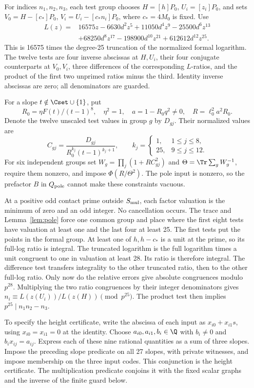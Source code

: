 For indices $n_1,n_2,n_3$, each test group chooses $H=[h]P_0$,
$U_i=[z_i]P_0$, and sets $V_0=H-[c_*]P_0$,
$V_i=U_i-[c_*n_i]P_0$, where $c_*=4M_0$ is fixed. Use
\begin{align*}
 L(z)={}&16575z-6630d^2z^5+11050d^4z^9-25500d^6z^{13}\\
        &+68250d^8z^{17}-198900d^{10}z^{21}+612612d^{12}z^{25}.
\end{align*}
This is 16575 times the degree-25 truncation of the normalized formal
logarithm. The twelve tests are four inverse abscissas at $H,U_i$,
their four conjugate counterparts at $V_0,V_i$, three differences of
the corresponding $L$-ratios, and the product of the first two unprimed
ratios minus the third. Identity inverse abscissas are zero; all
denominators are guarded.

For a slope $t\notin\Cset\cup\{1\}$, put
\[
 R_0=\eta F(t)/(t-1)^8,\quad\eta^2=1,\quad
 a=1-R_0q^2\ne0,\quad R=\ell_0^2a^2R_0.
\]
Denote the twelve unscaled test values in group $g$ by $D_{gj}$.
Their normalized values are
\[
 C_{gj}=\frac{D_{gj}}{R_0^{k_j}(t-1)^{k_j+1}},\qquad
 k_j=\begin{cases}1,&1\le j\le8,\\25,&9\le j\le12.\end{cases}
\]
For six independent groups set
$W_g=\prod_j(1+RC_{gj}^2)$ and
$\Theta=\Tr\sum_gW_g^{-1}$, require them nonzero, and impose
$\Phi(R/\Theta^2)$. The pole input is nonzero, so the prefactor $B$
in $Q_{\rm pole}$ cannot make these constraints vacuous.

At a positive odd contact prime outside $S_{\rm mul}$, each factor
valuation is the minimum of zero and an odd integer. No cancellation
occurs. The trace and Lemma~\ref{lem:pole} force one common group and
place where the first eight tests have valuation at least one and
the last four at least 25. The first tests put the points in the
formal group. At least one of $h,h-c_*$ is a unit at the prime, so its full-log
ratio is integral. The truncated logarithm is the full logarithm times
a unit congruent to one in valuation at least 28. Its ratio is therefore
integral. The difference test transfers integrality to the other truncated
ratio, then to the other full-log ratio. Only now do the relative errors
give absolute congruences modulo $p^{28}$. Multiplying the two ratio congruences
by their integer denominators gives
$n_i\equiv L(z(U_i))/L(z(H))\pmod{p^{25}}$.
The product test then implies $p^{25}\mid n_1n_2-n_3$.

To specify the height certificate, write the abscissa of each input as
$x_{i0}+x_{i1}s$, using $x_{i0}=x_{i1}=0$ at the identity. Choose
$a_{i0},a_{i1},b_i\in\Q$ with $b_i\ne0$ and
$b_i x_{ij}=a_{ij}$. Express each of these nine rational quantities
as a sum of three slopes. Impose the preceding slope predicate on
all 27 slopes, with private witnesses, and impose membership on the
three input codes. This conjunction is the height certificate.
The multiplication predicate conjoins it with the fixed scalar
graphs and the inverse of the finite guard below.

